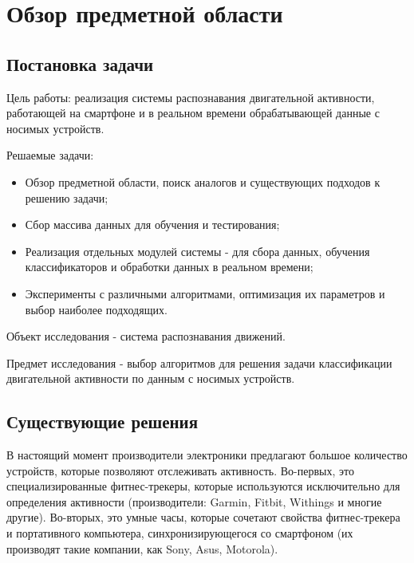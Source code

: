 \chapter{Обзор предметной области}

\section{Постановка задачи}

Цель работы: реализация системы распознавания двигательной активности, работающей на смартфоне и в реальном времени обрабатывающей данные с носимых устройств.

Решаемые задачи:
\begin{itemize}
\item Обзор предметной области, поиск аналогов и существующих подходов к решению задачи;
\item Сбор массива данных для обучения и тестирования;
\item Реализация отдельных модулей системы - для сбора данных, обучения классификаторов и обработки данных в реальном времени;
\item Эксперименты с различными алгоритмами, оптимизация их параметров и выбор наиболее подходящих.
\end{itemize}

Объект исследования - система распознавания движений.

Предмет исследования - выбор алгоритмов для решения задачи классификации двигательной активности по данным с носимых устройств. 

\section{Существующие решения}

В настоящий момент производители электроники предлагают большое количество устройств, которые позволяют отслеживать активность. Во-первых, это специализированные фитнес-трекеры, которые используются исключительно для определения активности (производители: Garmin, Fitbit, Withings и многие другие). Во-вторых, это умные часы, которые сочетают свойства фитнес-трекера и портативного компьютера, синхронизирующегося со смартфоном (их производят такие компании, как Sony, Asus, Motorola). 

